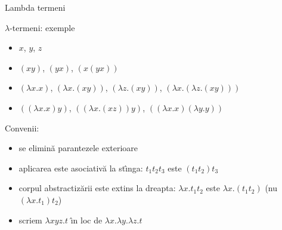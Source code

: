 \documentclass[xcolor=pdftex,romanian,colorlinks]{beamer}
\begin{document}
\begin{frame}[fragile]{ Lambda termeni }

\begin{block}{$\lambda$-termeni: exemple}
\begin{itemize}
\item $x$, $y$, $z$

\item  $(xy)$, $(yx)$, $(x(yx))$ 

\item $(\lambda x.x)$, $(\lambda x.(xy))$, $(\lambda z.(xy))$,
$(\lambda x.(\lambda z.(xy)))$ 
 

\item $((\lambda x. x)y)$, $((\lambda x.(xz))y)$, $((\lambda x. x)(\lambda y.y))$
\end{itemize}
\end{block}

\pause

Conven\ts ii:

\begin{itemize}
\item se elimin\u a parantezele exterioare
\item aplicarea este asociativ\u a la st\^{\i}nga: $t_1t_2t_3$ este $(t_1t_2)t_3$
\item corpul abstractiz\u arii este extins la dreapta: $\lambda x.t_1t_2$ este $\lambda x.(t_1t_2)$ (nu $(\lambda x.t_1)t_2$)
\item scriem $\lambda xyz.t$ \^{\i}n loc de $\lambda x.\lambda y.\lambda z.t$
\end{itemize}
\end{frame}
\end{document}
